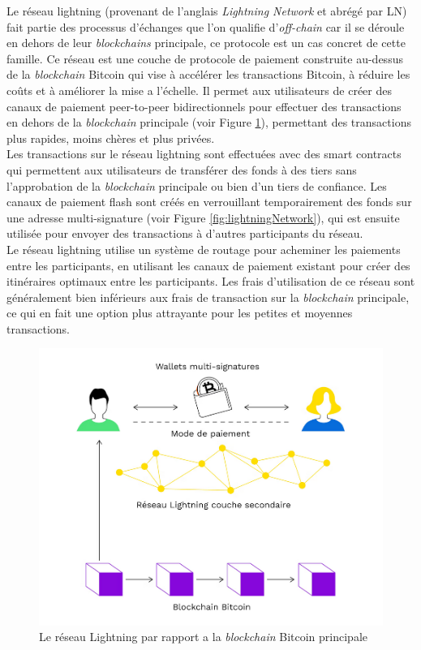 Le réseau lightning (provenant de l'anglais \textit{Lightning Network} et abrégé par LN) fait partie des processus d'échanges que l'on qualifie d'\textit{off-chain} car il se déroule en dehors de leur \textit{blockchains} principale, ce protocole est un cas concret de cette famille.
Ce réseau est une couche de protocole de paiement construite au-dessus de la \textit{blockchain} Bitcoin qui vise à accélérer les transactions  Bitcoin, à réduire les coûts et à améliorer la mise a l'échelle.
Il permet aux utilisateurs de créer des canaux de paiement peer-to-peer bidirectionnels  pour effectuer des transactions en dehors de la \textit{blockchain} principale (voir Figure \ref{fig:lightningCouche}), permettant des transactions plus rapides, moins chères et plus privées.\\
Les transactions sur le réseau lightning sont effectuées avec des smart contracts qui permettent aux utilisateurs de transférer des fonds à des tiers sans l'approbation de la \textit{blockchain} principale ou bien d'un tiers de confiance. 
Les canaux de paiement flash sont créés en verrouillant temporairement des fonds sur une adresse multi-signature (voir Figure \ref{fig:lightningNetwork}), qui est ensuite utilisée pour envoyer des transactions à d'autres participants du réseau.\\ 
Le réseau lightning utilise un système de routage pour acheminer les paiements entre les participants, en utilisant les canaux de paiement existant pour créer des itinéraires optimaux entre les participants. 
Les frais d'utilisation de ce réseau sont généralement bien inférieurs aux frais de transaction sur la \textit{blockchain} principale, ce qui en fait une option plus attrayante pour les  petites et moyennes transactions.

\begin{figure}[h!]  
    \includegraphics[scale = 0.3 ]{decentralisation/lightningCouche.png}    \centering
        \caption{Le réseau Lightning par rapport a la \textit{blockchain} Bitcoin principale}
        \label{fig:lightningCouche}
    \end{figure}

